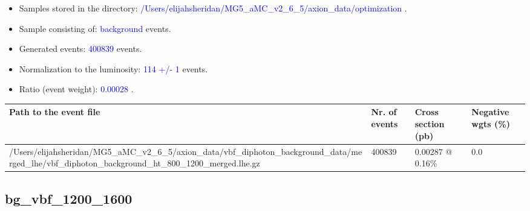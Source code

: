 \documentclass[a4paper, 10pt]{article}
\begin{document}
\begin{itemize}
  \item Samples stored in the directory: \textcolor{blue}{/\-Users/\-elijahsheridan/\-MG5\_aMC\_v2\_6\_5/\-axion\_data/\-optimization} .
   \item Sample consisting of: \textcolor{blue}{background}  events.
   \item Generated events: \textcolor{blue}{400839 }  events.
   \item Normalization to the luminosity: \textcolor{blue}{114}\textcolor{blue}{ +/\-- }\textcolor{blue}{1 }  events.
   \item Ratio (event weight): \textcolor{blue}{0.00028 } .  
 
\end{itemize}
\begin{table}[H]
  \begin{center}
    \begin{tabular}{|m{55.0mm}|m{25.0mm}|m{30.0mm}|m{30.0mm}|}
      \hline
      {\cellcolor{yellow}         Path to the event file}& {\cellcolor{yellow}         Nr. of events}& {\cellcolor{yellow}         Cross section (pb)}& {\cellcolor{yellow}         Negative wgts (\%)}\\
      \hline
      {\cellcolor{white}          /\-Users/\-elijahsheridan/\-MG5\_aMC\_v2\_6\_5/\-axion\_data/\-vbf\_diphoton\_background\_data/\-merged\_lhe/\-vbf\_diphoton\_background\_ht\_800\_1200\_merged.lhe.gz}& {\cellcolor{white}          400839}& {\cellcolor{white}          0.00287 @ 0.16\%}& {\cellcolor{white}          0.0}\\
\hline
    \end{tabular}
  \end{center}
\end{table}

\subsection{ bg\_vbf\_1200\_1600}
\end{document}
